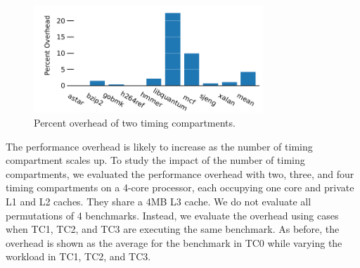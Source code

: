 \begin{figure}
   \begin{center}
       \includegraphics[width=3.4in]{figs/two_tcs.pdf}
       \caption{Percent overhead of two timing compartments.}
       \label{fig:two_tc_overhead}
   \end{center}
\end{figure}



The performance overhead is likely to increase as the number of timing 
compartment scales up. To study the impact of the number of timing 
compartments, we evaluated the performance overhead with two, three, and four 
timing compartments on a 4-core  processor, each occupying one core and private 
L1 and L2 caches. They share a 4MB L3 cache. We do not evaluate all 
permutations of 4 benchmarks. Instead, we evaluate the overhead using cases
when TC1, TC2, and TC3 are executing the same benchmark. As 
before, the overhead is shown as the average for the benchmark in TC0 while
varying the workload in TC1, TC2, and TC3.

